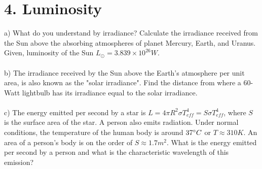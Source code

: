 \section*{4. Luminosity}

a) What do you understand by irradiance? Calculate the irradiance received from the Sun above the 
absorbing atmospheres of planet Mercury, Earth, and Uranus. Given, luminosity of the Sun 
$L_\odot = 3.839 \times 10^{26}W$.\\
\\
b) The irradiance received by the Sun above the Earth's atmosphere per unit area, is also known as the
"solar irradiance". Find the distance from where a 60-Watt lightbulb has its irradiance equal to the solar
irradiance.\\
\\
c) The energy emitted per second by a star is $L = 4 \pi R^2 \sigma T^4_{eff} = S \sigma T^4_{eff}$, where
$S$ is the surface area of the star. A person also emits radiation. Under normal conditions, the 
temperature of the human body is around $37 \degree C$ or $T \approx 310 K$. An area of a person's body
is on the order of $S \approx 1.7 m^2$. What is the energy emitted per second by a person and what is the
characteristic wavelength of this emission?\\
\\

